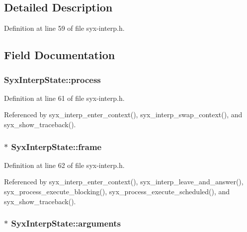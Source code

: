 \subsection{Detailed Description}


Definition at line 59 of file syx-interp.h.

\subsection{Field Documentation}
\hypertarget{struct_syx_interp_state_b09c376de8773f23719ee7545770c631}{
\subsubsection{ {\bf SyxInterpState::process}}}
\label{struct_syx_interp_state_b09c376de8773f23719ee7545770c631}




Definition at line 61 of file syx-interp.h.

Referenced by syx\_\-interp\_\-enter\_\-context(), syx\_\-interp\_\-swap\_\-context(), and syx\_\-show\_\-traceback().\hypertarget{struct_syx_interp_state_9b12d244885322068035a55236f27a37}{
\subsubsection{$\ast$ {\bf SyxInterpState::frame}}}
\label{struct_syx_interp_state_9b12d244885322068035a55236f27a37}




Definition at line 62 of file syx-interp.h.

Referenced by syx\_\-interp\_\-enter\_\-context(), syx\_\-interp\_\-leave\_\-and\_\-answer(), syx\_\-process\_\-execute\_\-blocking(), syx\_\-process\_\-execute\_\-scheduled(), and syx\_\-show\_\-traceback().\hypertarget{struct_syx_interp_state_21f99ebbaf71603731cf037118c8c13d}{
\subsubsection{$\ast$ {\bf SyxInterpState::arguments}}}
\label{struct_syx_interp_state_21f99ebbaf71603731cf037118c8c13d}




